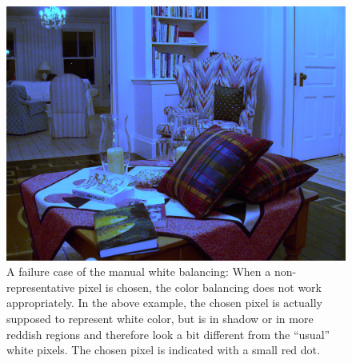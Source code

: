 \documentclass[a4paper]{article}
\begin{document}
\begin{figure}[H]
	\centering
	\includegraphics[width=\textwidth]{interior_manual_fail1}
\caption{A failure case of the manual white balancing: When a non-representative pixel is chosen, the color balancing does not work appropriately. In the above example, the chosen pixel is actually supposed to represent white color, but is in shadow or in more reddish regions and therefore look a bit different from the ``usual'' white pixels. The chosen pixel is indicated with a small red dot.}
\label{fig:manual-fail}
\end{figure}
\end{document}
